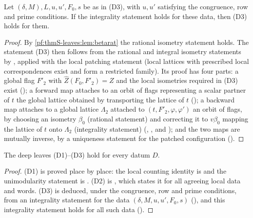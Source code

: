 \begin{proposition}\label{pf:thmS-leaves:prop:fstar}
Let $(\delta,M),L,u,u',F_0,s$ be as in (D3), with $u,u'$ satisfying the congruence, row and prime conditions. If the integrality
statement holds for these data, then (D3) holds for them.
\end{proposition}

\begin{proof}
By \cref{pf:thmS-leaves:lem:betarat} the rational isometry statement holds. The statement (D3) then follows from the rational and
integral isometry statements by , applied with the local
patching statement  (local lattices with prescribed local
correspondences exist and form a restricted family). Its proof has four parts: a global flag $F'_2$ with $\widehat Z(F_0,F'_2)=Z$ and the
local isometries required in (D3) exist (); a forward map attaches to an
orbit of flags representing a scalar partner of $t$ the global lattice obtained by transporting the lattice of $t$
(); a backward map attaches to a global lattice $\Lambda_2$ attached to
$(t,F'_2,\varphi,\varphi')$ an orbit of flags, by choosing an isometry $\beta_0$ (rational statement) and correcting it to $v\beta_0$ mapping the lattice
of $t$ onto $\Lambda_2$ (integrality statement) (, , and );
and the two maps are mutually inverse, by a uniqueness statement for the patched configuration
().
\end{proof}
\begin{theorem}\label{pf:thmS-leaves:thm:deep}
The deep leaves (D1)--(D3) hold for every datum $D$.
\end{theorem}

\begin{proof}
(D1) is proved place by place: the local counting identity is  and the
unimodularity statement is . (D2) is
, which states it for all agreeing local data and words. (D3) is deduced,
under the congruence, row and prime conditions, from an integrality statement for the data $(\delta,M,u,u',F_0,s)$
(), and this integrality statement holds for all such data
().
\end{proof}

